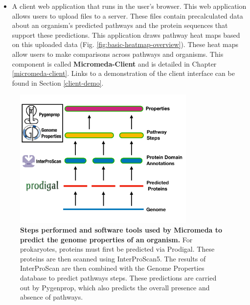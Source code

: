 \begin{itemize}
\item A client web application that runs in the user's browser. This web 
application allows users to upload files to a server. These files contain 
precalculated data about an organism's predicted pathways and the protein 
sequences that support these predictions. This application draws pathway 
heat maps based on this uploaded data  (Fig. \ref{fig:basic-heatmap-overview}). 
These heat maps allow users to make comparisons across pathways and organisms. 
This component is called \textbf{Micromeda-Client} and is detailed in Chapter 
\ref{micromeda-client}. Links to a demonstration of the client interface can be 
found in Section \ref{client-demo}.
\end{itemize}

\begin{figure}[!ht]
  \centering
	\includegraphics[width=0.8\textwidth]{media/micromeda-pipeline.pdf}
	 \caption[Steps performed and software tools used by Micromeda to predict the 
genome properties of an organism.]{\textbf{Steps performed and software tools 
used by Micromeda to predict the genome properties of an organism.} For 
prokaryotes, proteins must first be predicted via Prodigal. These proteins are 
then scanned using InterProScan5. The results of InterProScan are then combined 
with the Genome Properties database to predict pathways steps. These predictions 
are carried out by Pygenprop, which also predicts the overall presence and 
absence of pathways.}
	 \label{fig:micromeda-levels}
\end{figure}

